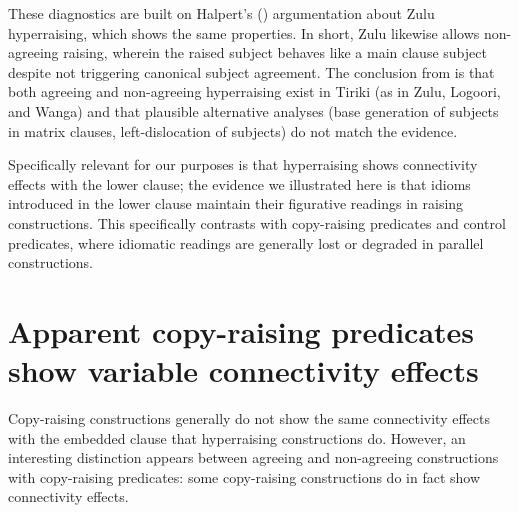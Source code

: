 \documentclass[output=paper,colorlinks,citecolor=brown
]{langscibook}
\begin{document}



These diagnostics are built on Halpert's (\citeyear{Halpert2019RaisingUnphased}) argumentation about Zulu hyperraising, which shows the same properties. In short, Zulu likewise allows non-agreeing raising, wherein the raised subject behaves like a main clause subject despite not triggering canonical subject agreement. The conclusion from  is that both agreeing and non-agreeing hyperraising exist in Tiriki (as in Zulu, Logoori, and Wanga) and that plausible alternative analyses (base generation of subjects in matrix clauses, left-dislocation of subjects) do not match the evidence.

Specifically relevant for our purposes is that hyperraising shows connectivity effects with the lower clause; the evidence we illustrated here is that idioms introduced in the lower clause maintain their figurative readings in raising constructions. This specifically contrasts with copy-raising predicates and control predicates, where idiomatic readings are generally lost or degraded in parallel constructions. 

\section{Apparent copy-raising predicates show variable connectivity effects}\label{sec:johnson:VarCRConnectivity}

Copy-raising constructions generally do not show the same connectivity effects with the embedded clause that hyperraising constructions do. However, an interesting distinction appears between agreeing and non-agreeing constructions with copy-raising predicates: some copy-raising constructions do in fact show connectivity effects.
\end{document}
